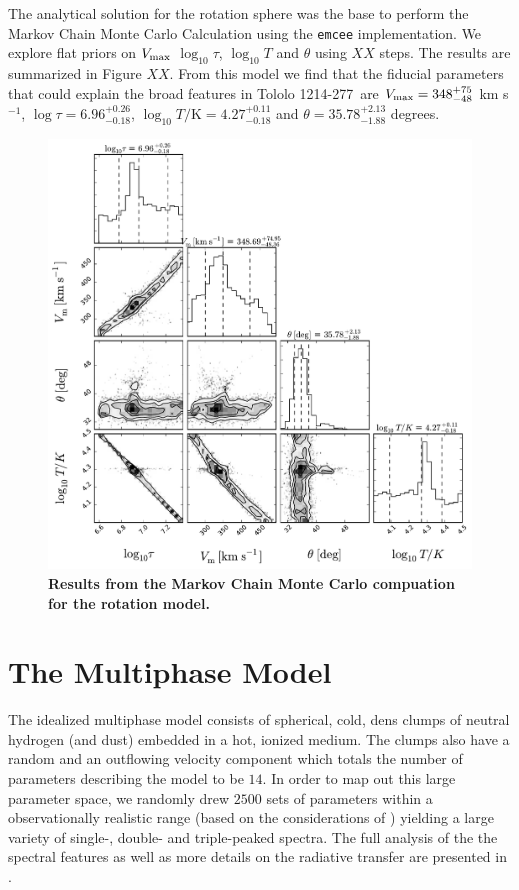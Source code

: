 \documentclass[a4paper, usenatbib, 12pt]{article}
\newcommand{\tol}{Tololo 1214-277}
\begin{document}
{The analytical solution for the rotation sphere was the base to
perform the Markov Chain Monte Carlo Calculation using the
\texttt{emcee} implementation.
We explore flat priors on $V_{\rm max}$ $\log_{10}\tau$, $\log_{10} T$ and
$\theta$ using $XX$ steps.
The results are summarized in Figure $XX$. 
From this model we find that the fiducial parameters that could
explain the broad features in \tol\ are $V_{\rm max}=348^{+75}_{-48}$
km s$^{-1}$, $\log \tau = 6.96^{+0.26}_{-0.18}$, $\log_{10} T/\mathrm
{K} = 4.27^{+0.11}_{-0.18}$ and  $\theta = 35.78^{+2.13}_{-1.88}$ degrees.


\begin{figure}
\begin{center}
\includegraphics[width=1.0\textwidth]{emcee_results.pdf}
\caption{{\bf Results from the Markov Chain Monte Carlo compuation for the rotation model.}}
\end{center}
\end{figure}





\section*{The Multiphase Model} 

The idealized multiphase model consists of spherical, cold, dens
clumps of neutral hydrogen (and dust) embedded in a hot, ionized
medium. 
The clumps also have a random and an outflowing velocity
component which totals the number of parameters describing the model
to be $14$. 
In order to map out this large parameter space, we randomly drew
$2500$ sets of parameters within a observationally realistic range
(based on the considerations of \cite{Laursen2013ApJ...766..124L})
yielding a large variety of single-, double- and triple-peaked
spectra. 
The full analysis of the the spectral features as well as
more details on the radiative transfer are presented in
\cite{Gronke2016}.    
 

}
\end{document}

